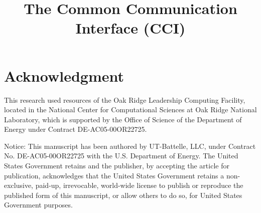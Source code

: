 \documentclass[conference]{IEEEtran}
\begin{document}
%
\title{The Common Communication Interface (CCI)}
% 
\author{
}

\maketitle




\IEEEpeerreviewmaketitle

\newcommand{\note}[1]{\colorbox{yellow!50}{Note: #1}}

\newcommand{\f}[1]{\texttt{#1{\kern-2pt}()}}

\newcommand{\us}{\hbox{\textmu}s\kern+3pt}








\section*{Acknowledgment}


This research used resources of the Oak
Ridge Leadership Computing Facility, located in the National
Center for Computational Sciences at Oak Ridge National
Laboratory, which is supported by the Office of Science of the
Department of Energy under Contract DE-AC05-00OR22725.

Notice: This manuscript has been authored by UT-Battelle, LLC, under
Contract No. DE-AC05-00OR22725 with the U.S. Department of Energy.
The United States Government retains and the publisher, by accepting
the article for publication, acknowledges that the United States Government
retains a non-exclusive, paid-up, irrevocable, world-wide license
to publish or reproduce the published form of this manuscript, or allow
others to do so, for United States Government purposes.
\end{document}
